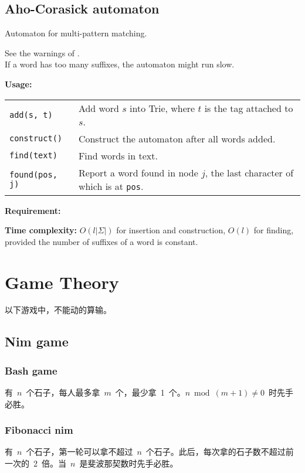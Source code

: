 \subsection{Aho-Corasick automaton}
Automaton for multi-pattern matching. \par
\Warning See the warnings of . \\
\Warning If a word has too many suffixes, the automaton might run slow. \par
\textbf{Usage:} \\[0.1cm]
\begin{tabular}{p{2.5cm} p{9cm}}
  \lstinline|add(s, t)| & Add word $s$ into Trie, where $t$ is the tag attached to $s$.  \\
  \lstinline|construct()| & Construct the automaton after all words added. \\
  \lstinline|find(text)| & Find words in text. \\
  \lstinline|found(pos, j)| & Report a word found in node $j$, the last character of which is at \lstinline|pos|. \\
\end{tabular} \par
\textbf{Requirement:} \\
 \par
\textbf{Time complexity:} $O(l|\Sigma|)$ for insertion and construction, $O(l)$ for finding, provided the number of suffixes of a word is constant. \par


\section{Game Theory}
以下游戏中，不能动的算输。
\subsection{Nim game}
\subsubsection{Bash game}
有~$n$~个石子，每人最多拿~$m$~个，最少拿~1~个。$n \bmod (m+1) \neq 0$~时先手必胜。
\subsubsection{Fibonacci nim}
有~$n$~个石子，第一轮可以拿不超过~$n$~个石子。此后，每次拿的石子数不超过前一次的~2~倍。当~$n$~是斐波那契数时先手必胜。
